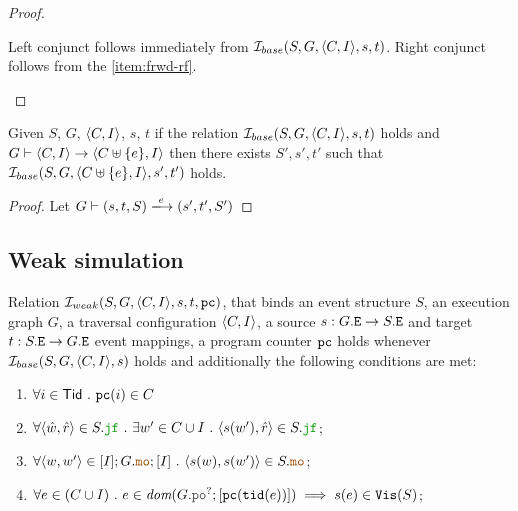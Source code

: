 \documentclass[12pt]{article}
\begin{document}
\begin{proof}
\begin{itemize}
    Left conjunct follows immediately from $\mathcal{I}_{base}(S, G, \langle C, I \rangle, s, t)$.
    Right conjunct follows from the \ref{item:frwd-rf}.
    
  \end{itemize}
  
\end{proof}

\begin{lemma}
  Given $S$, $G$, $\langle C, I \rangle$, $s$, $t$
  if the relation $\mathcal{I}_{base}(S, G, \langle C, I \rangle, s, t)$ holds and
  $G \vdash \langle C, I \rangle \rightarrow \langle C \uplus \{e\}, I \rangle$ then
  there exists $S', s', t'$ such that $\mathcal{I}_{base}(S, G, \langle C \uplus \{e\}, I \rangle, s', t')$ holds.
\end{lemma}

\begin{proof}
  Let $G \vdash (s, t, S) \ESstep{e} (s', t', S')$
\end{proof}

\subsection{Weak simulation}

\begin{definition}
  Relation $\mathcal{I}_{weak}(S, G, \langle C, I \rangle, s, t, {\mathtt{pc}})$, that binds an 
  event structure $S$, an \imm execution graph $G$,
  a traversal configuration $\langle C, I \rangle$,
  a source $s : G.{\mathtt{E}} \rightarrow S.{\mathtt{E}}$ and target $t : S.{\mathtt{E}} \rightarrow G.{\mathtt{E}}$ event mappings,
  a program counter ${\mathtt{pc}}$
  holds whenever $\mathcal{I}_{base}(S, G, \langle C, I \rangle, s)$ holds and
  additionally the following conditions are met:
  \begin{enumerate}[label=\textbf{S.\arabic*},start=6]

    \item \label{item:sim-pc}
      $\forall{i \in \mathsf{Tid}} ~.~ {\mathtt{pc}}(i) \in C$



    


    \item \label{item:sim-jf}
      $
      \forall{\tup{\hat{w}, \hat{r}} \in \lES.\lJF} ~.~
      \exists{w' \in \lC \cup \lI} ~.~ \tup{s(w'), \hat{r}} \in \lES.\lJF
      $;



    \item \label{item:sim-mo}
      $\forall{\tup{w, w'} \in [\lI];\lG.\lMO;[\lI]} ~.~ \tup{s(w), s(w')} \in \lES.\lMO$;
      
    \item \label{item:sim-vis-weak}
      $\forall{e \in (C \cup I)} ~.~
      e \in \dom{G.\lPO^?;[\lPC(\lTID(e))]} \implies s(e) \in \lVIS(S)$;

  \end{enumerate}
\end{definition}
\end{document}
